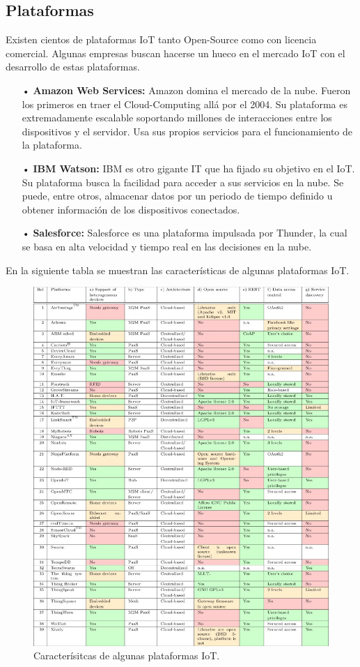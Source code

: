 \documentclass[12pt, twoside]{book}
\begin{document}
\subsection{Plataformas}
Existen cientos de plataformas IoT tanto Open-Source como con licencia comercial. Algunas empresas buscan hacerse un hueco en el mercado IoT con el desarrollo de estas plataformas. 
\begin{itemize}
\item[•]\textbf{Amazon Web Services: }Amazon domina el mercado de la nube. Fueron los primeros en traer el Cloud-Computing allá por el 2004. Su plataforma es extremadamente escalable soportando millones de interacciones entre los dispositivos y el servidor. Usa sus propios servicios para el funcionamiento de la plataforma. 
\item[•]\textbf{IBM Watson: }IBM es otro gigante IT que ha fijado su objetivo en el IoT. Su plataforma busca la facilidad para acceder a sus servicios en la nube. Se puede, entre otros, almacenar datos por un periodo de tiempo definido u obtener información de los dispositivos conectados.  
\item[•]\textbf{Salesforce: } Salesforce es una plataforma impulsada por Thunder, la cual se basa en alta velocidad y tiempo real en las decisiones en la nube.
\end{itemize}
En la siguiente tabla se muestran las características de algunas plataformas IoT.
\begin{figure}[H]
\centering
\includegraphics[scale=0.7]{images/platforms}
\caption{Caracterísitcas de algunas plataformas IoT\cite{platform_gap}.}\label{L400}
\end{figure}
\end{document}
